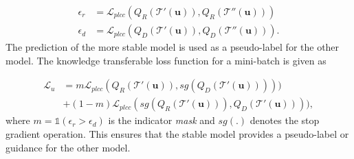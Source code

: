 \documentclass[10pt,twocolumn,letterpaper]{article}
\begin{document}
\begin{equation*}
\begin{split}
    \epsilon_r &= \mathcal{L}_{plcc}(Q_R(\mathcal{T}'(\mathbf{u})), Q_R(\mathcal{T}''(\mathbf{u})))\\
    \epsilon_d &= \mathcal{L}_{plcc}(Q_D(\mathcal{T}'(\mathbf{u})), Q_D(\mathcal{T}''(\mathbf{u}))) .
\end{split}
\end{equation*}
The prediction of the more stable model is used as a pseudo-label for the other model. The knowledge transferable loss function for a mini-batch is given as

\begin{equation}
\begin{split}
    \mathcal{L}_u &= m \mathcal{L}_{plcc}(Q_R(\mathcal{T}'(\mathbf{u})), sg(Q_D(\mathcal{T}'(\mathbf{u})))))\\
                  &+ (1 -m)\mathcal{L}_{plcc}(sg(Q_R(\mathcal{T}'(\mathbf{u}))), Q_D(\mathcal{T}'(\mathbf{u})))),
\end{split}
\label{stab_loss}
\end{equation}
where  $m=\mathds{1}(\epsilon_r > \epsilon_d)$ is the indicator \textit{mask} and $sg(.)$ denotes the stop gradient operation. This ensures that the stable model provides a pseudo-label or guidance for the other model.
\end{document}
